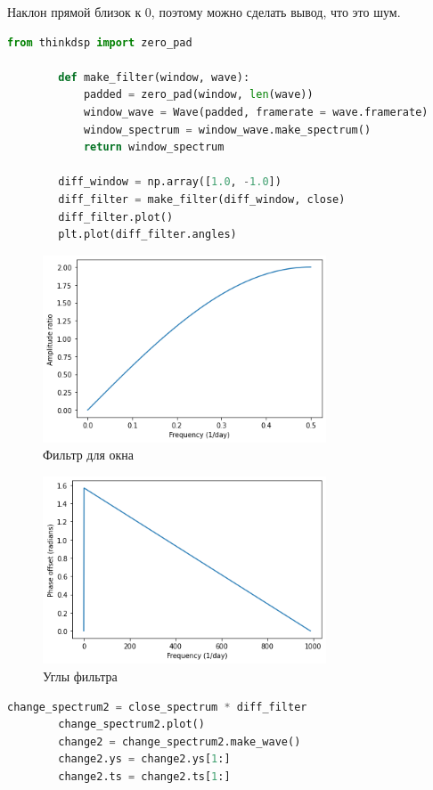 \documentclass[a4paper, 12pt]{report}
\begin{document}
	Наклон прямой близок к 0, поэтому можно сделать вывод, что это  шум.
	\begin{lstlisting}[language=Python,caption=Умножение на фильтр - свертка с окном]
		from thinkdsp import zero_pad

		def make_filter(window, wave):
			padded = zero_pad(window, len(wave))
			window_wave = Wave(padded, framerate = wave.framerate)
			window_spectrum = window_wave.make_spectrum()
			return window_spectrum

		diff_window = np.array([1.0, -1.0])
		diff_filter = make_filter(diff_window, close)
		diff_filter.plot()
		plt.plot(diff_filter.angles)
	\end{lstlisting}
	\begin{figure}[H]
		\centering
		\includegraphics[width=0.75\textwidth]{fac6.png}
		\caption{Фильтр для окна}
		\label{fig:fac6}
	\end{figure}
	\begin{figure}[H]
		\centering
		\includegraphics[width=0.75\textwidth]{fac7.png}
		\caption{Углы фильтра}
		\label{fig:fac7}
	\end{figure}
	\begin{lstlisting}[language=Python,caption=Умножаем спектр цен на полученный фильтр]
		change_spectrum2 = close_spectrum * diff_filter
		change_spectrum2.plot()
		change2 = change_spectrum2.make_wave()
		change2.ys = change2.ys[1:]
		change2.ts = change2.ts[1:]
	\end{lstlisting}
\end{document}
